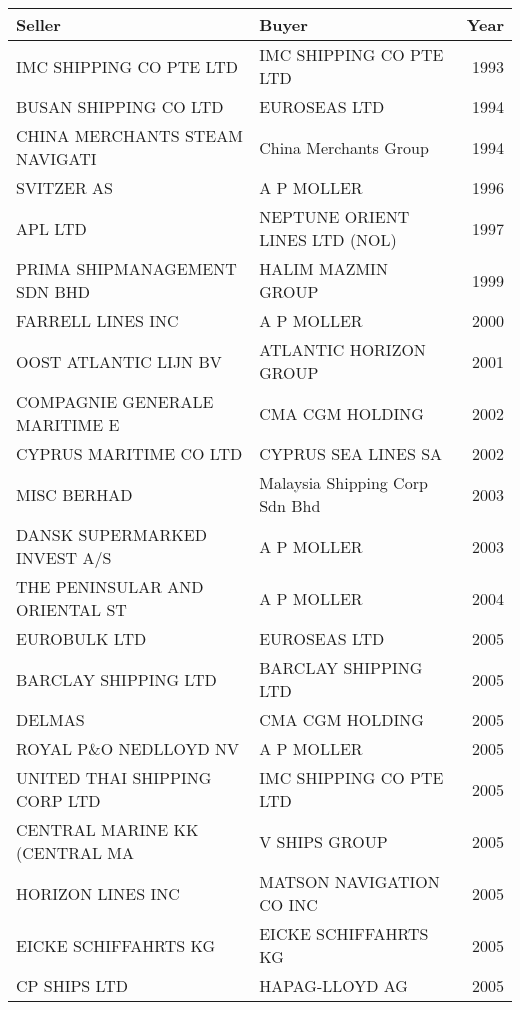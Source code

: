 
\begin{tabular}[t]{llr}
\toprule
Seller & Buyer & Year\\
\midrule
IMC SHIPPING CO PTE LTD & IMC SHIPPING CO PTE LTD & 1993\\
BUSAN SHIPPING CO LTD & EUROSEAS LTD & 1994\\
CHINA MERCHANTS STEAM NAVIGATI & China Merchants Group & 1994\\
SVITZER AS & A P MOLLER & 1996\\
APL LTD & NEPTUNE ORIENT LINES LTD (NOL) & 1997\\
PRIMA SHIPMANAGEMENT SDN BHD & HALIM MAZMIN GROUP & 1999\\
FARRELL LINES INC & A P MOLLER & 2000\\
OOST ATLANTIC LIJN BV & ATLANTIC HORIZON GROUP & 2001\\
COMPAGNIE GENERALE MARITIME E & CMA CGM HOLDING & 2002\\
CYPRUS MARITIME CO LTD & CYPRUS SEA LINES SA & 2002\\
MISC BERHAD & Malaysia Shipping Corp Sdn Bhd & 2003\\
DANSK SUPERMARKED INVEST A/S & A P MOLLER & 2003\\
THE PENINSULAR AND ORIENTAL ST & A P MOLLER & 2004\\
EUROBULK LTD & EUROSEAS LTD & 2005\\
BARCLAY SHIPPING LTD & BARCLAY SHIPPING LTD & 2005\\
DELMAS & CMA CGM HOLDING & 2005\\
ROYAL P\&O NEDLLOYD NV & A P MOLLER & 2005\\
UNITED THAI SHIPPING CORP LTD & IMC SHIPPING CO PTE LTD & 2005\\
CENTRAL MARINE KK (CENTRAL MA & V SHIPS GROUP & 2005\\
HORIZON LINES INC & MATSON NAVIGATION CO INC & 2005\\
EICKE SCHIFFAHRTS KG & EICKE SCHIFFAHRTS KG & 2005\\
CP SHIPS LTD & HAPAG-LLOYD AG & 2005\\
\bottomrule
\end{tabular}
